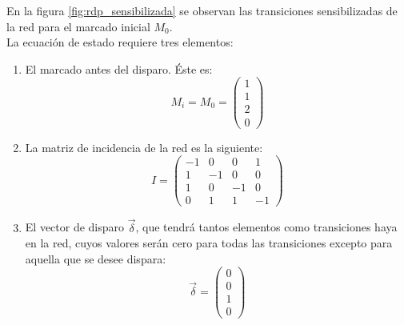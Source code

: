 En la figura \ref{fig:rdp_sensibilizada} se observan las transiciones sensibilizadas de la red para el marcado inicial $M_0$.
\\
La ecuación de estado requiere tres elementos:
\begin{enumerate}
    \item El marcado antes del disparo. Éste es:
        \begin{equation}
            M_i = M_0 = 
            \begin{pmatrix}
                1 \\
                1 \\
                2 \\
                0
            \end{pmatrix}
        \end{equation}
        
    \item La matriz de incidencia de la red es la siguiente:
        \begin{equation}
           I = 
            \begin{pmatrix}
                -1 & 0 & 0 & 1 \\
                1 & -1 & 0 & 0 \\
                1 & 0 & -1 & 0 \\
                0 & 1 & 1 & -1 
            \end{pmatrix}
        \end{equation}
        
    \item El vector de disparo $\vec{\delta}$, que tendrá tantos elementos como transiciones haya en la red, cuyos valores serán cero para todas las transiciones excepto para aquella que se desee dispara:
        \begin{equation}
            \vec{\delta} = 
            \begin{pmatrix}
                0 \\
                0 \\
                1 \\
                0
            \end{pmatrix}
        \end{equation}
\end{enumerate}


